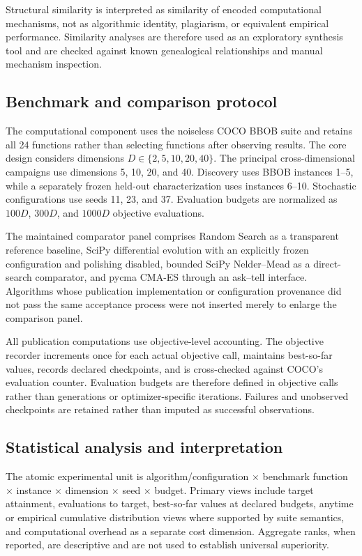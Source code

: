 Structural similarity is interpreted as similarity of encoded computational mechanisms, not as algorithmic identity, plagiarism, or equivalent empirical performance. Similarity analyses are therefore used as an exploratory synthesis tool and are checked against known genealogical relationships and manual mechanism inspection.

\subsection{Benchmark and comparison protocol}

The computational component uses the noiseless COCO BBOB suite and retains all 24 functions rather than selecting functions after observing results. The core design considers dimensions \(D\in\{2,5,10,20,40\}\). The principal cross-dimensional campaigns use dimensions 5, 10, 20, and 40. Discovery uses BBOB instances 1--5, while a separately frozen held-out characterization uses instances 6--10. Stochastic configurations use seeds 11, 23, and 37. Evaluation budgets are normalized as \(100D\), \(300D\), and \(1000D\) objective evaluations.

The maintained comparator panel comprises Random Search as a transparent reference baseline, SciPy differential evolution with an explicitly frozen configuration and polishing disabled, bounded SciPy Nelder--Mead as a direct-search comparator, and pycma CMA-ES through an ask--tell interface. Algorithms whose publication implementation or configuration provenance did not pass the same acceptance process were not inserted merely to enlarge the comparison panel.

All publication computations use objective-level accounting. The objective recorder increments once for each actual objective call, maintains best-so-far values, records declared checkpoints, and is cross-checked against COCO's evaluation counter. Evaluation budgets are therefore defined in objective calls rather than generations or optimizer-specific iterations. Failures and unobserved checkpoints are retained rather than imputed as successful observations.

\subsection{Statistical analysis and interpretation}

The atomic experimental unit is algorithm/configuration \(\times\) benchmark function \(\times\) instance \(\times\) dimension \(\times\) seed \(\times\) budget. Primary views include target attainment, evaluations to target, best-so-far values at declared budgets, anytime or empirical cumulative distribution views where supported by suite semantics, and computational overhead as a separate cost dimension. Aggregate ranks, when reported, are descriptive and are not used to establish universal superiority.

